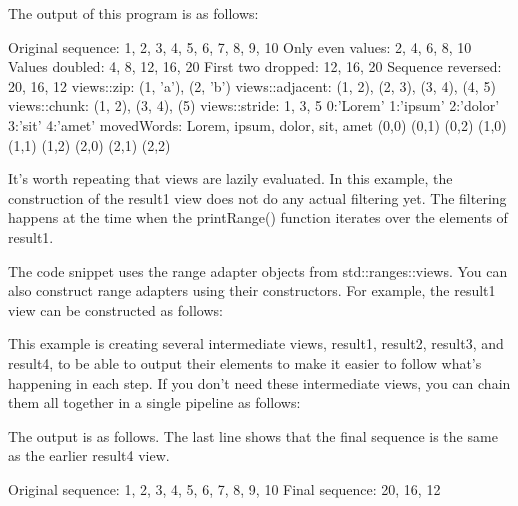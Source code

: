The output of this program is as follows:

\begin{shell}
Original sequence: 1, 2, 3, 4, 5, 6, 7, 8, 9, 10
Only even values: 2, 4, 6, 8, 10
Values doubled: 4, 8, 12, 16, 20
First two dropped: 12, 16, 20
Sequence reversed: 20, 16, 12
views::zip: (1, 'a'), (2, 'b')
views::adjacent: (1, 2), (2, 3), (3, 4), (4, 5)
views::chunk: (1, 2), (3, 4), (5)
views::stride: 1, 3, 5
0:'Lorem' 1:'ipsum' 2:'dolor' 3:'sit' 4:'amet'
movedWords: Lorem, ipsum, dolor, sit, amet
(0,0) (0,1) (0,2) (1,0) (1,1) (1,2) (2,0) (2,1) (2,2)
\end{shell}

It’s worth repeating that views are lazily evaluated. In this example, the construction of the result1 view does not do any actual filtering yet. The filtering happens at the time when the printRange() function iterates over the elements of result1.

The code snippet uses the range adapter objects from std::ranges::views. You can also construct range adapters using their constructors. For example, the result1 view can be constructed as follows:


This example is creating several intermediate views, result1, result2, result3, and result4, to be able to output their elements to make it easier to follow what’s happening in each step. If you don’t need these intermediate views, you can chain them all together in a single pipeline as follows:


The output is as follows. The last line shows that the final sequence is the same as the earlier result4 view.

\begin{shell}
Original sequence: 1, 2, 3, 4, 5, 6, 7, 8, 9, 10
Final sequence: 20, 16, 12
\end{shell}

